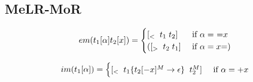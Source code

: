 \documentclass[12pt]{article}
\begin{document}
\begin{landscape}
\newpage 

\subsection{MeLR-MoR}

\begin{equation}
em(t_1[\alpha]t_2[x])= 
\begin{cases}
[_< \;\; t_1\;t_2] & $ if $\alpha = $ =$x \\
([_> \;\; t_2\; t_1] & $ if $ \alpha = x$=$)
\end{cases}
\end{equation}

\begin{equation}
im(t_1[\alpha]) =
\begin{cases}
[_< \;\; t_1\{t_2[-x]^M \rightarrow \epsilon\} \;\; t_2^M] & $ if $\alpha = +x \\
\end{cases}
\end{equation}



\end{landscape}
\end{document}
